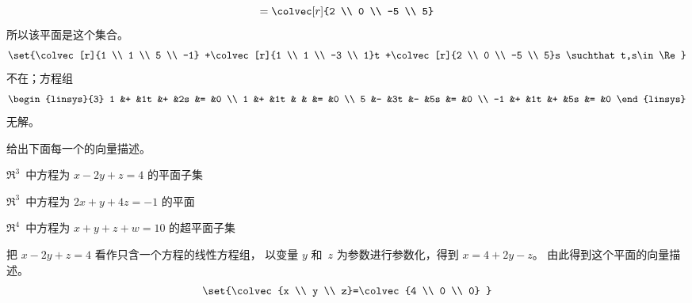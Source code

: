 \begin{exercises}
\begin{answer}
\begin{exparts}
\begin{equation*}
            =\colvec[r]{2 \\ 0 \\ -5 \\ 5}
          \end{equation*}
          所以该平面是这个集合。
          \begin{equation*}
            \set{\colvec[r]{1 \\ 1 \\ 5 \\ -1}
                 +\colvec[r]{1 \\ 1 \\ -3 \\ 1}t
                 +\colvec[r]{2 \\ 0 \\ -5 \\ 5}s
                \suchthat t,s\in\Re}
          \end{equation*}
        \partsitem 不在；方程组
          \begin{equation*}
            \begin{linsys}{3}
              1  &+  &1t  &+  &2s  &=  &0  \\
              1  &+  &1t  &   &    &=  &0  \\
              5  &-  &3t  &-  &5s  &=  &0  \\
             -1  &+  &1t  &+  &5s  &=  &0  
            \end{linsys}
          \end{equation*}
          无解。
      \end{exparts}  
    \end{answer}
  \item 给出下面每一个的向量描述。
    \begin{exparts}
      \item $\Re^3$~中方程为 $x-2y+z=4$ 的平面子集
      \item $\Re^3$~中方程为 $2x+y+4z=-1$ 的平面
      \item $\Re^4$~中方程为 $x+y+z+w=10$ 的超平面子集
    \end{exparts}
    \begin{answer}
      \begin{exparts}
        \item 把 $x-2y+z=4$ 看作只含一个方程的线性方程组，
          以变量 $y$ 和~$z$ 为参数进行参数化，得到
          $x=4+2y-z$。
          由此得到这个平面的向量描述。
          \begin{equation*}
            \set{\colvec{x \\ y \\ z}=\colvec{4 \\ 0 \\ 0}
}
\end{equation*}
\end{exparts}
\end{answer}
\end{exercises}
